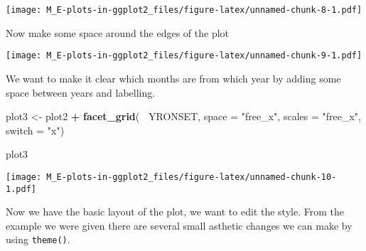 \documentclass[]{article}
\newenvironment{Shaded}{\begin{snugshade}}{\end{snugshade}}
\newcommand{\DataTypeTok}[1]{\textcolor[rgb]{0.13,0.29,0.53}{#1}}
\newcommand{\FloatTok}[1]{\textcolor[rgb]{0.00,0.00,0.81}{#1}}
\newcommand{\KeywordTok}[1]{\textcolor[rgb]{0.13,0.29,0.53}{\textbf{#1}}}
\newcommand{\NormalTok}[1]{#1}
\newcommand{\OperatorTok}[1]{\textcolor[rgb]{0.81,0.36,0.00}{\textbf{#1}}}
\newcommand{\StringTok}[1]{\textcolor[rgb]{0.31,0.60,0.02}{#1}}
\begin{document}
\texttt{[image: M\_E-plots-in-ggplot2\_files/figure-latex/unnamed-chunk-8-1.pdf]}

Now make some space around the edges of the plot

\begin{Shaded}
\end{Shaded}

\texttt{[image: M\_E-plots-in-ggplot2\_files/figure-latex/unnamed-chunk-9-1.pdf]}

We want to make it clear which months are from which year by adding some
space between years and labelling.

\begin{Shaded}
\begin{Highlighting}[]
\NormalTok{plot3 <-}\StringTok{ }
\StringTok{  }\NormalTok{plot2 }\OperatorTok{+}
\StringTok{  }\KeywordTok{facet_grid}\NormalTok{(}\OperatorTok{~}\StringTok{ }\NormalTok{YRONSET, }\DataTypeTok{space =} \StringTok{"free_x"}\NormalTok{, }\DataTypeTok{scales =} \StringTok{"free_x"}\NormalTok{, }\DataTypeTok{switch =} \StringTok{"x"}\NormalTok{)}

\NormalTok{plot3}
\end{Highlighting}
\end{Shaded}

\texttt{[image: M\_E-plots-in-ggplot2\_files/figure-latex/unnamed-chunk-10-1.pdf]}

Now we have the basic layout of the plot, we want to edit the style.
From the example we were given there are several small asthetic changes
we can make by using \texttt{theme()}.
\end{document}

